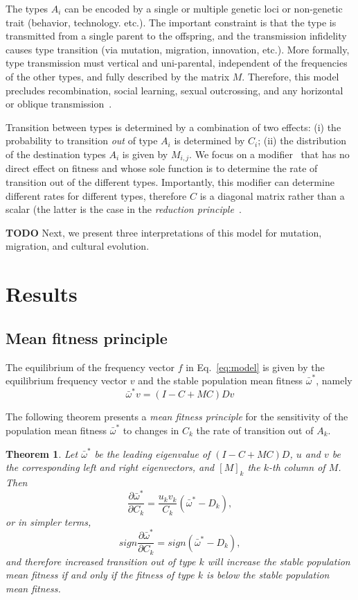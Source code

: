 \documentclass[a4paper,twocolumn]{article}   	%
\newtheorem*{theorem}{Theorem}
\begin{document}
The types $A_i$ can be encoded by a single or multiple genetic loci or non-genetic trait (behavior, technology. etc.).
The important constraint is that the type is transmitted from a single parent to the offspring, and the transmission infidelity causes type transition (via mutation,
migration, innovation, etc.).
More formally, type transmission must vertical and uni-parental, independent of the frequencies of the other types, and fully described by the matrix $M$. Therefore, this model precludes recombination, social learning, sexual outcrossing, and any horizontal or oblique transmission~\cite[pg.~54]{Cavalli-Sforza1981}.

Transition between types is determined by a combination of two effects:
(i) the probability to transition \emph{out} of type $A_i$ is determined by $C_i$;
(ii) the distribution of the destination types $A_i$ is given by $M_{i,j}$.
We focus on a modifier~\citep{Altenberg2017} that has no direct effect on fitness and whose sole function is to determine the rate of transition out of the different types.
Importantly, this modifier can determine different rates for different types, therefore $C$ is a diagonal matrix rather than a scalar (the latter is the case in the \emph{reduction principle}~\citep{Altenberg2017}.

\textbf{TODO} Next, we present three interpretations of this model for
mutation, migration, and cultural evolution.

\section*{Results}
\subsection*{Mean fitness principle}

The equilibrium of the frequency vector $f$ in Eq.~\ref{eq:model} is given by the equilibrium frequency vector $v$ and the stable population mean fitness
$\bar{\omega}^*$, namely
\begin{equation}\label{eq:model_equilibrium}
\bar{\omega}^* v = (I-C+MC)D v
\end{equation}

The following theorem presents a \emph{mean fitness principle} for the
sensitivity of the population mean fitness $\bar{\omega}^*$ to changes
in $C_k$ the rate of transition out of $A_k$.

\begin{theorem}
Let $\bar{\omega}^*$ be the leading eigenvalue of $(I-C+MC)D$, $u$ and $v$ be the corresponding left and right eigenvectors, and $[M]_k$ the $k$-th column of $M$. Then
\begin{equation}\label{eq:theorem}
\frac{\partial \bar{\omega}^*}{\partial C_k} = 
\frac{u_k v_k}{C_k} (\bar{\omega}^* - D_k),
\end{equation}
or in simpler terms,
$$
sign\frac{\partial \bar{\omega}^*}{\partial C_k} = 
sign(\bar{\omega}^* - D_k), 
$$
and therefore increased transition out of type $k$ will increase the stable population mean fitness if and only if the fitness of type $k$ is below the stable population mean fitness.
\end{theorem}
\end{document}
